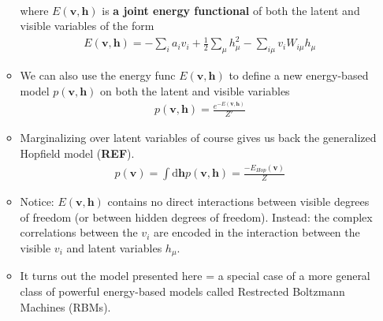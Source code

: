 \documentclass[norsk,a4paper,11pt]{article}
\begin{document}
\begin{itemize}
\begin{itemize}
\begin{align}
		\end{align}
		where $E(\bm{v}, \bm{h})$ is \textbf{a joint energy functional} of both the latent and visible variables of the form
		\begin{align}
			E(\bm{v}, \bm{h}) = - \sum_i a_i v_i + \frac{1}{2} \sum_\mu h_\mu^2 - \sum_{i\mu} v_i W_{i\mu} h_\mu 
		\end{align}
		\item We can also use the energy func $E(\bm{v}, \bm{h})$ to define a new energy-based model $p(\bm{v}, \bm{h})$ on both the latent and visible variables
		\begin{align}
			p(\bm{v}, \bm{h}) = \frac{e^{-E(\bm{v}, \bm{h})}}{Z'}
		\end{align}
		\item Marginalizing over latent variables of course gives us back the generalized Hopfield model (\textbf{REF}).
		\begin{align}
			p(\bm{v}) = \int \text{d}\bm{h} p(\bm{v}, \bm{h}) = \frac{-E_{Hop}(\bm{v})}{Z}
		\end{align}
		\item Notice: $E(\bm{v}, \bm{h})$ contains no direct interactions between visible degrees of freedom (or between hidden degrees of freedom). Instead: the complex correlations between the $v_i$ are encoded in the interaction between the visible $v_i$ and latent variables $h_\mu$.
		\item It turns out the model presented here = a special case of a more general class of powerful energy-based models called Restrected Boltzmann Machines (RBMs).
	\end{itemize}
\end{itemize}
\end{document}
